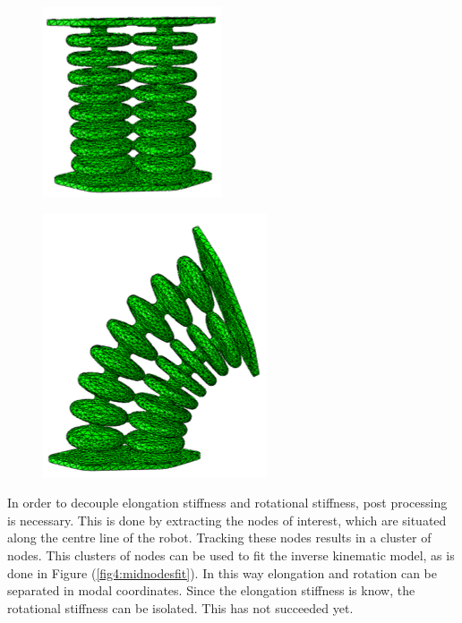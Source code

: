 \begin{figure}[H]
\centering
\begin{minipage}{.5\textwidth}
  \centering
  \includegraphics[width=0.6\linewidth]{Figures/Chapter3/singlesideundeformed60kPa.png}
  \label{fig4:undeformed}
\end{minipage}%
\begin{minipage}{.5\textwidth}
  \centering
  \includegraphics[width=0.65\linewidth]{Figures/Chapter3/singlesideddeformed60kPa.png}
  \label{fig4:deformed}
\end{minipage}
\end{figure}

In order to decouple elongation stiffness and rotational stiffness, post processing is necessary. This is done by extracting the nodes of interest, which are situated along the centre line of the robot. Tracking these nodes results in a cluster of nodes. This clusters of nodes can be used to fit the inverse kinematic model, as is done in Figure (\ref{fig4:midnodesfit}). In this way elongation and rotation can be separated in modal coordinates. Since the elongation stiffness is know, the rotational stiffness can be isolated. This has not succeeded yet.


